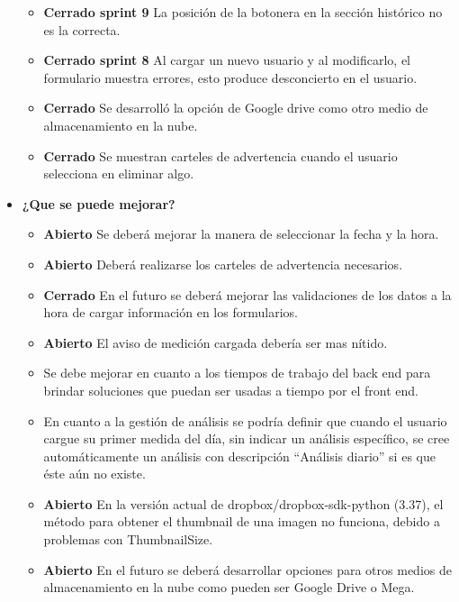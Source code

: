 \begin{itemize}
\begin{itemize}
 			\item \textbf{Cerrado sprint 9} La posición de la botonera en la sección histórico no es la correcta.		         										
 			\item \textbf{Cerrado sprint 8} Al cargar un nuevo usuario y al modificarlo, el formulario muestra errores, esto produce desconcierto en el usuario.
		        \item \textbf{Cerrado} Se desarrolló la opción de Google drive como otro medio de almacenamiento en la nube.
		        \item \textbf{Cerrado } Se muestran carteles de advertencia cuando el usuario selecciona en eliminar algo.
 		\end{itemize}
 		
 		\item \textbf{¿Que se puede mejorar?}
 		\begin{itemize}
 
 			\item \textbf{Abierto} Se deberá mejorar la manera de seleccionar la fecha y la hora.
 			\item \textbf{Abierto} Deberá realizarse los carteles de advertencia necesarios.
		    \item \textbf{Cerrado} En el futuro se deberá mejorar las validaciones de los datos a la hora de cargar información en los formularios. 
			 \item \textbf{Abierto}  El aviso de medición cargada debería ser mas nítido.
			 \item Se debe mejorar en cuanto a los tiempos de trabajo del back end para brindar soluciones que puedan ser usadas a tiempo por el front end.
			 \item En cuanto a la gestión de análisis se podría definir que cuando el usuario cargue su primer medida del día, sin indicar un análisis específico, se cree automáticamente un análisis con descripción ``Análisis diario'' si es que éste aún no existe.	
	          \item \textbf{Abierto} En la versión actual de dropbox/dropbox-sdk-python (3.37), el método para obtener el thumbnail de una imagen no funciona, debido a problemas con ThumbnailSize.			 		 		    
		        \item \textbf{Abierto} En el futuro se deberá desarrollar opciones para otros medios de almacenamiento en la nube como pueden ser Google Drive o Mega.	          
 		\end{itemize}
 		
 		
 	\end{itemize}